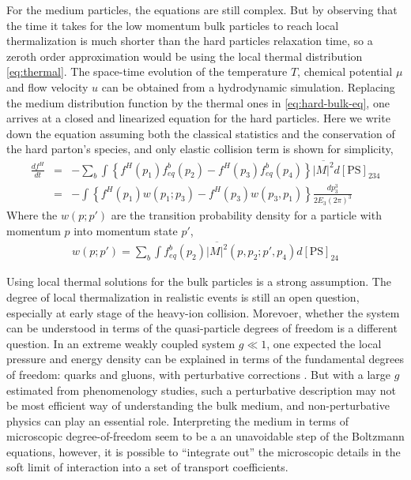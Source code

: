 For the medium particles, the equations are still complex.
But by observing that the time it takes for the low momentum bulk particles to reach local thermalization is much shorter than the hard particles relaxation time, so a zeroth order approximation would be using the local thermal distribution \ref{eq:thermal}.
The space-time evolution of the temperature $T$, chemical potential $\mu$ and flow velocity $u$ can be obtained from a hydrodynamic simulation.
Replacing the medium distribution function by the thermal ones in \ref{eq:hard-bulk-eq}, one arrives at a closed and linearized equation for the hard particles.
Here we write down the equation assuming both the classical statistics and the conservation of the hard parton's species, and only elastic collision term is shown for simplicity,
\begin{eqnarray}
\frac{df^H}{dt} &=& -\sum_{b} \int \left\{
f^H(p_1)f^b_{eq}(p_2) - f^H(p_3)f^b_{eq}(p_4)\right\}
\overline{|M|^2} d[\textrm{PS}]_{234} \\
&=& - \int \left\{
f^H(p_1) w(p_1; p_3) - f^H(p_3) w(p_3, p_1)\right\}\frac{dp_3^3}{2E_3 (2\pi)^3}
\end{eqnarray}
Where the $w(p; p')$ are the transition probability density for a particle with momentum $p$ into momentum state $p'$,
\begin{eqnarray}
w(p; p') = \sum_b\int f_{eq}^b(p_2) \overline{|M|^2}(p, p_2; p', p_4) d[\textrm{PS}]_{24}
\end{eqnarray}

Using local thermal solutions for the bulk particles is a strong assumption. 
The degree of local thermalization in realistic events is still an open question, especially at early stage of the heavy-ion collision. 
Morevoer, whether the system can be understood in terms of the quasi-particle degrees of freedom is a different question.
In an extreme weakly coupled system $g\ll 1$, one expected the local pressure and energy density can be explained in terms of the fundamental degrees of freedom: quarks and gluons, with perturbative corrections \cite{Blaizot:2000fc,Strickland:2010tm,Su:2015esa,}.
But with a large $g$ estimated from phenomenology studies, such a perturbative description may not be most efficient way of understanding the bulk medium, and non-perturbative physics can play an essential role. 
Interpreting the medium in terms of microscopic degree-of-freedom seem to be a an unavoidable step of the Boltzmann equations, however, it is possible to ``integrate out'' the microscopic details in the soft limit of interaction into a set of transport coefficients.

